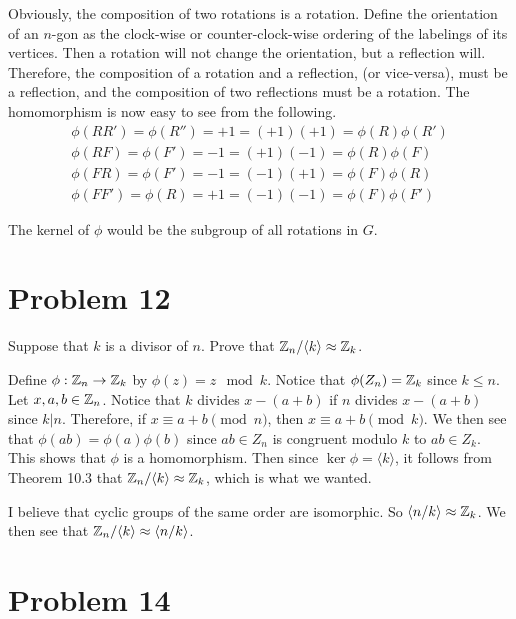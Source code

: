 \documentclass{article}
\begin{document}
Obviously, the composition of two rotations is a rotation.  Define the orientation of an $n$-gon as the
clock-wise or counter-clock-wise ordering of the labelings of its vertices.  Then a rotation
will not change the orientation, but a reflection will.  Therefore, the composition of a
rotation and a reflection, (or vice-versa), must be a reflection, and the composition of
two reflections must be a rotation.
The homomorphism is now easy to see from the following.
\begin{align*}
\phi(RR')=\phi(R'')=+1=(+1)(+1)=\phi(R)\phi(R') \\
\phi(RF)=\phi(F')=-1=(+1)(-1)=\phi(R)\phi(F) \\
\phi(FR)=\phi(F')=-1=(-1)(+1)=\phi(F)\phi(R) \\
\phi(FF')=\phi(R)=+1=(-1)(-1)=\phi(F)\phi(F')
\end{align*}

The kernel of $\phi$ would be the subgroup of all rotations in $G$.

\section*{Problem 12}

Suppose that $k$ is a divisor of $n$.  Prove that $\mathbb{Z}_n/\langle k\rangle\approx\mathbb{Z}_k$.

Define $\phi:\mathbb{Z}_n\to\mathbb{Z}_k$ by $\phi(z)=z\mod k$.
Notice that $\phi(Z_n)=\mathbb{Z}_k$ since $k\leq n$.
Let $x,a,b\in \mathbb{Z}_n$.
Notice that $k$ divides $x-(a+b)$ if $n$ divides $x-(a+b)$ since $k|n$.
Therefore, if $x\equiv a+b\pmod{n}$, then $x\equiv a+b\pmod{k}$.
We then see that $\phi(ab)=\phi(a)\phi(b)$ since $ab\in Z_n$ is congruent modulo $k$ to
$ab\in Z_k$.
This shows that $\phi$ is a homomorphism.  Then since $\ker\phi=\langle k\rangle$,
it follows from Theorem 10.3 that $\mathbb{Z}_n/\langle k\rangle\approx\mathbb{Z}_k$, which is what we wanted.

I believe that cyclic groups of the same order are isomorphic.  So $\langle n/k\rangle\approx\mathbb{Z}_k$.
We then see that $\mathbb{Z}_n/\langle k\rangle\approx\langle n/k\rangle$.

\section*{Problem 14}
\end{document}
